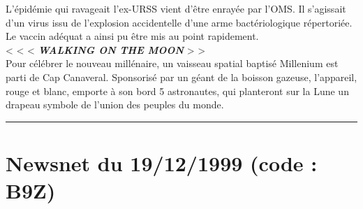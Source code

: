 \documentclass[11pt,twoside,a4paper]{book}
\begin{document}
L'{\'e}pid{\'e}mie qui ravageait l'ex-URSS vient d'{\^e}tre enray{\'e}e par l'OMS. Il s'agissait d'un virus issu de l'explosion accidentelle d'une arme bact{\'e}riologique r{\'e}pertori{\'e}e. Le vaccin ad{\'e}quat a ainsi pu {\^e}tre mis au point rapidement.~\\
< < <  \textbf{\textit{WALKING ON THE MOON}} > >~\\
Pour c{\'e}l{\'e}brer le nouveau mill{\'e}naire, un vaisseau spatial baptis{\'e} Millenium est parti de Cap Canaveral. Sponsoris{\'e} par un g{\'e}ant de la boisson gazeuse, l'appareil, rouge et blanc, emporte {\`a} son bord 5 astronautes, qui planteront sur la Lune un drapeau symbole de l'union des peuples du monde.~\\

\hrule 

\clearpage

\section*{Newsnet du 19/12/1999 (code : B9Z)}
\end{document}

